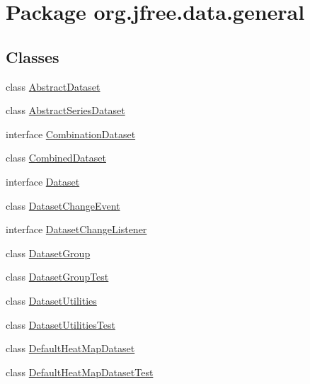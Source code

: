 \hypertarget{namespaceorg_1_1jfree_1_1data_1_1general}{}\section{Package org.\+jfree.\+data.\+general}
\label{namespaceorg_1_1jfree_1_1data_1_1general}
\subsection*{Classes}
\begin{DoxyCompactItemize}
\item 
class \mbox{\hyperlink{classorg_1_1jfree_1_1data_1_1general_1_1_abstract_dataset}{Abstract\+Dataset}}
\item 
class \mbox{\hyperlink{classorg_1_1jfree_1_1data_1_1general_1_1_abstract_series_dataset}{Abstract\+Series\+Dataset}}
\item 
interface \mbox{\hyperlink{interfaceorg_1_1jfree_1_1data_1_1general_1_1_combination_dataset}{Combination\+Dataset}}
\item 
class \mbox{\hyperlink{classorg_1_1jfree_1_1data_1_1general_1_1_combined_dataset}{Combined\+Dataset}}
\item 
interface \mbox{\hyperlink{interfaceorg_1_1jfree_1_1data_1_1general_1_1_dataset}{Dataset}}
\item 
class \mbox{\hyperlink{classorg_1_1jfree_1_1data_1_1general_1_1_dataset_change_event}{Dataset\+Change\+Event}}
\item 
interface \mbox{\hyperlink{interfaceorg_1_1jfree_1_1data_1_1general_1_1_dataset_change_listener}{Dataset\+Change\+Listener}}
\item 
class \mbox{\hyperlink{classorg_1_1jfree_1_1data_1_1general_1_1_dataset_group}{Dataset\+Group}}
\item 
class \mbox{\hyperlink{classorg_1_1jfree_1_1data_1_1general_1_1_dataset_group_test}{Dataset\+Group\+Test}}
\item 
class \mbox{\hyperlink{classorg_1_1jfree_1_1data_1_1general_1_1_dataset_utilities}{Dataset\+Utilities}}
\item 
class \mbox{\hyperlink{classorg_1_1jfree_1_1data_1_1general_1_1_dataset_utilities_test}{Dataset\+Utilities\+Test}}
\item 
class \mbox{\hyperlink{classorg_1_1jfree_1_1data_1_1general_1_1_default_heat_map_dataset}{Default\+Heat\+Map\+Dataset}}
\item 
class \mbox{\hyperlink{classorg_1_1jfree_1_1data_1_1general_1_1_default_heat_map_dataset_test}{Default\+Heat\+Map\+Dataset\+Test}}

\end{DoxyCompactItemize}
